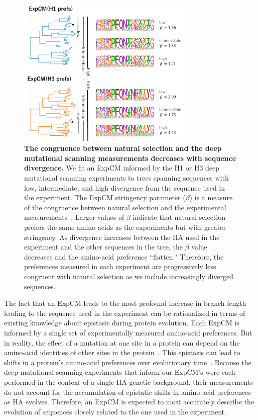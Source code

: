 \documentclass[11pt]{article}
\begin{document}
\begin{figure}
\centerline{\includegraphics[width=0.75\textwidth]{figures/compete}}
\caption{\label{fig:compete}
\textbf{The congruence between natural selection and the deep mutational scanning measurements decreases with sequence divergence.} 
We fit an ExpCM informed by the H1 or H3 deep mutational scanning experiments to trees spanning sequences with low, intermediate, and high divergence from the sequence used in the experiment. 
The ExpCM stringency parameter ($\beta$) is a measure of the congruence between natural selection and the experimental measurements~\citep{bloom2014informed,hilton2017phydms}. 
Larger values of $\beta$ indicate that natural selection prefers the same amino acids as the experiments but with greater stringency. 
As divergence increases between the HA used in the experiment and the other sequences in the tree, the $\beta$ value decreases and the amino-acid preference ``flatten."
Therefore, the preferences measured in each experiment are progressively less congruent with natural selection as we include increasingly diverged sequences. 
}
\end{figure}

The fact that an ExpCM leads to the most profound increase in branch length leading to the sequence used in the experiment can be rationalized in terms of existing knowledge about epistasis during protein evolution.
Each ExpCM is informed by a single set of experimentally measured amino-acid preferences.
But in reality, the effect of a mutation at one site in a protein can depend on the amino-acid identities of other sites in the protein~\citep{ortlund2007crystal, gong2013stability, harms2014historical, tufts2014epistasis, starr2018pervasive}. 
This epistasis can lead to shifts in a protein's amino-acid preferences over evolutionary time~\citep{pollock2012amino, doud2015site, shah2015contingency, bazykin2015changing, haddox2018mapping}.
Because the deep mutational scanning experiments that inform our ExpCM's were each performed in the context of a single HA genetic background, their measurements do not account for the accumulation of epistatic shifts in amino-acid preferences as HA evolves. 
Therefore, an ExpCM is expected to most accurately describe the evolution of sequences closely related to the one used in the experiment.
 
\end{document}
